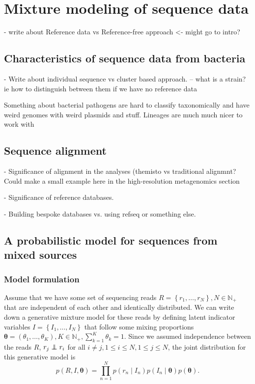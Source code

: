 \documentclass[officiallayout]{tktla}
\newcommand\indept{\protect\mathpalette{\protect\independenT}{\perp}}
\def\independenT#1#2{\mathrel{\rlap{$#1#2$}\mkern2mu{#1#2}}}
\begin{document}
\chapter{Mixture modeling of sequence data}

- write about Reference data vs Reference-free approach <- might go to intro?

\section{Characteristics of sequence data from bacteria}

- Write about individual sequence vs cluster based approach.
-- what is a strain? ie how to distinguish between them if we have no reference data

Something about bacterial pathogens are hard to classify taxonomically
and have weird genomes with weird plasmids and stuff.  Lineages are
much much nicer to work with

\section{Sequence alignment}

- Significance of alignment in the analyses (themisto vs traditional alignmnt? Could make a small example here in the high-resolution metagenomics section

- Significance of reference databases.

- Building bespoke databases vs. using refseq or something else.

\section{A probabilistic model for sequences from mixed sources}

\subsection{Model formulation}

Assume that we have some set of sequencing reads $R = \left\{r_{1},
\dots, r_{N}\right\}, N \in \mathbb{N}_{+}$ that are independent of
each other and identically distributed. We can write down a generative
mixture model for these reads by defining latent indicator variables
$I = \left\{I_{1}, \dots, I_{N}\right\}$ that follow some mixing
proportions $\boldsymbol{\theta} = \left(\theta_{1}, \dots,
\theta_{K}\right), K \in \mathbb{N}_{+}, \sum_{k = 1}^{K} \theta_{k} =
1$. Since we assumed independence between the reads $R$, $r_{j}
\indept r_{i}$ for all $i \neq j, 1 \leq i \leq N, 1 \leq j \leq N$, the joint
distribution for this generative model is
\begin{equation}
  \label{model:joint-distribution}
  p\left(R, I, \boldsymbol\theta\right) = \prod_{n = 1}^{N}p\left(r_{n} \middle| I_{n}\right) p\left(I_{n} \middle| \boldsymbol\theta\right)p\left(\boldsymbol\theta\right).
\end{equation}
\end{document}
